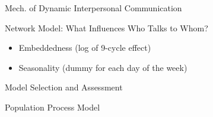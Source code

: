 \documentclass[10pt]{beamer}
\begin{document}
\begin{frame}{Mech. of Dynamic Interpersonal Communication}
\begin{block}{Network Model: What Influences Who Talks to Whom?}
\begin{itemize}
\item<1-8> Embeddedness (log of 9-cycle effect)
\item<1-8> Seasonality (dummy for each day of the week)
\end{itemize}
\end{block}

\end{frame}




\begin{frame}{}
\begin{block}{}
\centering
Model Selection and Assessment 
\end{block}

\end{frame}



\begin{frame}{Population Process Model}
\begin{center}
{

}
\end{center}
\end{frame}
\end{document}
